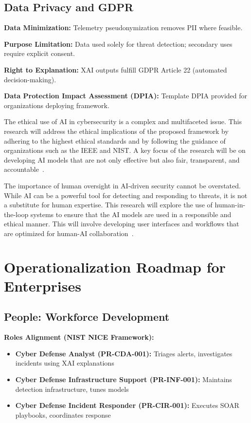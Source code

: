 \subsection{Data Privacy and GDPR}
\textbf{Data Minimization:} Telemetry pseudonymization removes PII where feasible.

\textbf{Purpose Limitation:} Data used solely for threat detection; secondary uses require explicit consent.

\textbf{Right to Explanation:} XAI outputs fulfill GDPR Article 22 (automated decision-making).

\textbf{Data Protection Impact Assessment (DPIA):} Template DPIA provided for organizations deploying framework.

The ethical use of AI in cybersecurity is a complex and multifaceted issue. This research will address the ethical implications of the proposed framework by adhering to the highest ethical standards and by following the guidance of organizations such as the IEEE and NIST. A key focus of the research will be on developing AI models that are not only effective but also fair, transparent, and accountable~\cite{kpmg2024ethical}.

The importance of human oversight in AI-driven security cannot be overstated. While AI can be a powerful tool for detecting and responding to threats, it is not a substitute for human expertise. This research will explore the use of human-in-the-loop systems to ensure that the AI models are used in a responsible and ethical manner. This will involve developing user interfaces and workflows that are optimized for human-AI collaboration~\cite{ukcybersecuritycouncil2024oversight}.

\section{Operationalization Roadmap for Enterprises}\label{sec:policy-operationalization}
\subsection{People: Workforce Development}
\textbf{Roles Alignment (NIST NICE Framework):}
\begin{itemize}
    \item \textbf{Cyber Defense Analyst (PR-CDA-001):} Triages alerts, investigates incidents using XAI explanations
    \item \textbf{Cyber Defense Infrastructure Support (PR-INF-001):} Maintains detection infrastructure, tunes models
    \item \textbf{Cyber Defense Incident Responder (PR-CIR-001):} Executes SOAR playbooks, coordinates response
\end{itemize}

